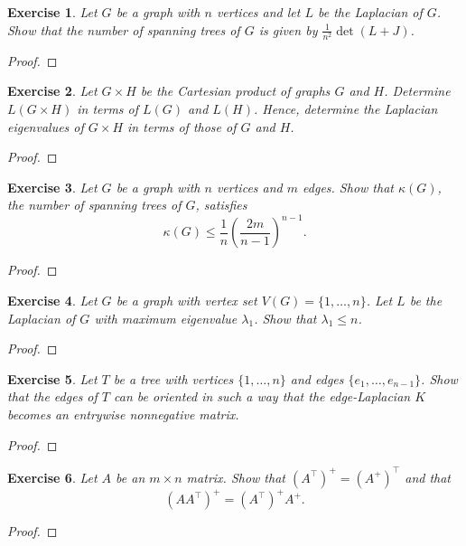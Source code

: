 \documentclass[11pt]{article}
\newtheorem{exercise}{Exercise}[section]
\theoremstyle{definition}
\begin{document}
\begin{exercise}
Let $G$ be a graph with $n$ vertices and let $L$ be the Laplacian of $G$. Show that the
number of spanning trees of $G$ is given by $\frac{1}{n^2}\det(L+J)$.
\end{exercise}
\begin{proof}
\end{proof}

\begin{exercise}
Let $G\times H$ be the Cartesian product of graphs $G$ and $H$. Determine $L(G\times H)$
in terms of $L(G)$ and $L(H)$. Hence, determine the Laplacian eigenvalues of $G\times H$
in terms of those of $G$ and $H$.
\end{exercise}
\begin{proof}
\end{proof}

\begin{exercise}
Let $G$ be a graph with $n$ vertices and $m$ edges. Show that $\kappa(G)$, the number of
spanning trees of $G$, satisfies
\[
\kappa(G)\le \frac{1}{n}\left(\frac{2m}{n-1}\right)^{n-1}.
\]
\end{exercise}
\begin{proof}
\end{proof}

\begin{exercise}
Let $G$ be a graph with vertex set $V(G)=\{1,\ldots,n\}$. Let $L$ be the Laplacian of $G$
with maximum eigenvalue $\lambda_1$. Show that $\lambda_1\le n$.
\end{exercise}
\begin{proof}
\end{proof}

\begin{exercise}
Let $T$ be a tree with vertices $\{1,\ldots,n\}$ and edges $\{e_1,\ldots,e_{n-1}\}$.
Show that the edges of $T$ can be oriented in such a way that the edge-Laplacian $K$
becomes an entrywise nonnegative matrix.
\end{exercise}
\begin{proof}
\end{proof}

\begin{exercise}
Let $A$ be an $m\times n$ matrix. Show that $(A^\top)^{+}=(A^{+})^\top$ and that
\[
(AA^\top)^{+}=(A^\top)^{+}A^{+}.
\]
\end{exercise}
\begin{proof}
\end{proof}

\clearpage
\end{document}
